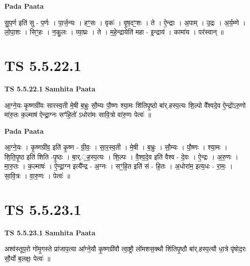 \documentclass[17pt]{extarticle}
\begin{document}
\textbf{Pada Paata} \newline

सु॒प॒र्ण इति॑ सु - प॒र्णः । पा॒र्ज॒न्यः । हꣳ॒॒सः । वृकः॑ । वृ॒ष॒दꣳ॒॒शः । ते । ऐ॒न्द्राः । अ॒पाम् । उ॒द्रः । अ॒र्य॒म्णे । लो॒पा॒शः । सिꣳ॒॒हः । न॒कु॒लः । व्या॒घ्रः । ते । म॒हे॒न्द्रायेति॑ महा - इ॒न्द्राय॑ । कामा॑य । पर॑स्वान् ॥  \newline





\section{ TS 5.5.22.1 }

\textbf{TS 5.5.22.1 } \newline
\textbf{Samhita Paata} \newline

आ॒ग्ने॒यः कृ॒ष्णग्री॑वः सारस्व॒ती मे॒षी ब॒भ्रुः सौ॒म्यः पौ॒ष्णः श्या॒मः शि॑तिपृ॒ष्ठो बा॑र्.हस्प॒त्यः शि॒ल्पो वै᳚श्वदे॒व ऐ॒न्द्रो॑ऽरु॒णो मा॑रु॒तः क॒ल्माष॑ ऐन्द्रा॒ग्नः सꣳ॑हि॒तो॑ ऽधोरा॑मः सावि॒त्रो वा॑रु॒णः पेत्वः॑ ॥ \newline

\textbf{Pada Paata} \newline

आ॒ग्ने॒यः । कृ॒ष्णग्री॑व॒ इति॑ कृ॒ष्ण - ग्री॒वः॒ । सा॒र॒स्व॒ती । मे॒षी । ब॒भ्रुः । सौ॒म्यः । पौ॒ष्णः । श्या॒मः । शि॒ति॒पृ॒ष्ठ इति॑ शिति -पृ॒ष्ठः । बा॒र्.॒ह॒स्प॒त्यः । शि॒ल्पः । वै॒श्व॒दे॒व इति॑ वैश्व - दे॒वः । ऐ॒न्द्रः । अ॒रु॒णः । मा॒रु॒तः । क॒ल्माषः॑ । ऐ॒न्द्रा॒ग्न इत्यै᳚न्द्र - अ॒ग्नः । सꣳ॒॒हि॒त इति॑ सं - हि॒तः । अ॒धोरा॑म॒ इत्य॒धः - रा॒मः॒ । सा॒वि॒त्रः । वा॒रु॒णः । पेत्वः॑ ॥  \newline





\section{ TS 5.5.23.1 }

\textbf{TS 5.5.23.1 } \newline
\textbf{Samhita Paata} \newline

अश्व॑स्तूप॒रो गो॑मृ॒गस्ते प्रा॑जाप॒त्या आ᳚ग्ने॒यौ कृ॒ष्णग्री॑वौ त्वा॒ष्ट्रौ लो॑मशस॒क्थौ शि॑तिपृ॒ष्ठौ बा॑र्.हस्प॒त्यौ धा॒त्रे पृ॑षोद॒रः सौ॒र्यो ब॒लक्षः॒ पेत्वः॑ ॥ \newline
\end{document}

